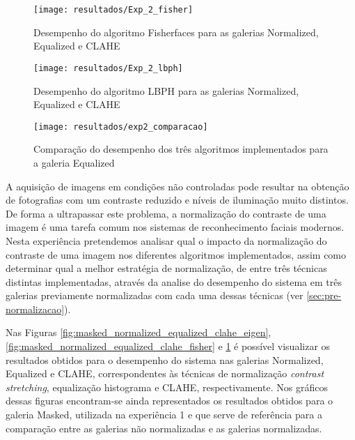         \begin{figure}[p]
                \centering
                \texttt{[image: resultados/Exp\_2\_fisher]}
                \caption{Desempenho do algoritmo Fisherfaces para as galerias Normalized, Equalized e CLAHE}
                \label{fig:masked_normalized_equalized_clahe_fisher}
                \centering
                \texttt{[image: resultados/Exp\_2\_lbph]}
                \caption{Desempenho do algoritmo LBPH para as galerias Normalized, Equalized e CLAHE}
                \label{fig:masked_normalized_equalized_clahe_lbph}                
        \end{figure}%
        
\begin{figure}[ht]
  \begin{center}
    \leavevmode
    \texttt{[image: resultados/exp2\_comparacao]}
    \caption{Comparação do desempenho dos três algoritmos implementados para a galeria Equalized}
    \label{fig:exp2_comaparacao}
  \end{center}
\end{figure}        


A aquisição de imagens em condições não controladas pode resultar na obtenção de fotografias com um contraste reduzido e níveis de iluminação muito distintos. De forma a ultrapassar este problema, a normalização do contraste de uma imagem é uma tarefa comum nos sistemas de reconhecimento faciais modernos. Nesta experiência pretendemos analisar qual o impacto da normalização do contraste de uma imagem nos diferentes algoritmos implementados, assim como determinar qual a melhor estratégia de normalização, de entre três técnicas distintas implementadas, através da analise do desempenho do sistema em três galerias previamente normalizadas com cada uma dessas técnicas (ver \ref{sec:pre-normalizacao}).

Nas Figuras \ref{fig:masked_normalized_equalized_clahe_eigen}, \ref{fig:masked_normalized_equalized_clahe_fisher} e \ref{fig:masked_normalized_equalized_clahe_lbph} é possível visualizar os resultados obtidos para o desempenho do sistema nas galerias Normalized, Equalized e CLAHE, correspondentes às técnicas de normalização \textit{contrast stretching}, equalização histograma e CLAHE, respectivamente. Nos gráficos dessas figuras encontram-se ainda representados os resultados obtidos para o galeria Masked, utilizada na experiência 1 e que serve de referência para a comparação entre as galerias não normalizadas e as galerias normalizadas.

